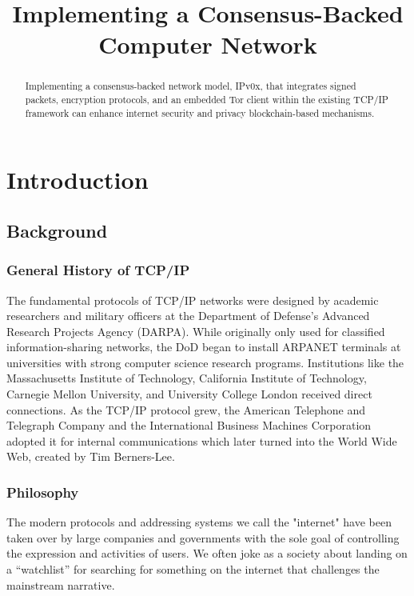 \documentclass{article}
\title{Implementing a Consensus-Backed Computer Network}
\begin{document}
\maketitlepage
\newpage

\tableofcontents
\newpage

\begin{abstract}
Implementing a consensus-backed network model, IPv0x, that integrates signed packets, encryption protocols, and an embedded Tor client within the existing TCP/IP framework can enhance internet security and privacy blockchain-based mechanisms.
\end{abstract}
\newpage

\makeheader    
\maketitle    

\section{Introduction}
\subsection{Background}
\subsubsection{General History of TCP/IP}
The fundamental protocols of TCP/IP networks were designed by academic researchers and military officers at the Department of Defense's Advanced Research Projects Agency (DARPA). While originally only used for classified information-sharing networks, the DoD began to install ARPANET terminals at universities with strong computer science research programs. Institutions like the Massachusetts Institute of Technology, California Institute of Technology, Carnegie Mellon University, and University College London received direct connections. As the TCP/IP protocol grew, the American Telephone and Telegraph Company and the International Business Machines Corporation adopted it for internal communications which later turned into the World Wide Web, created by Tim Berners-Lee. 

\subsubsection{Philosophy}
The modern protocols and addressing systems we call the "internet" have been taken over by large companies and governments with the sole goal of controlling the expression and activities of users. We often joke as a society about landing on a “watchlist” for searching for something on the internet that challenges the mainstream narrative. 
\end{document}
